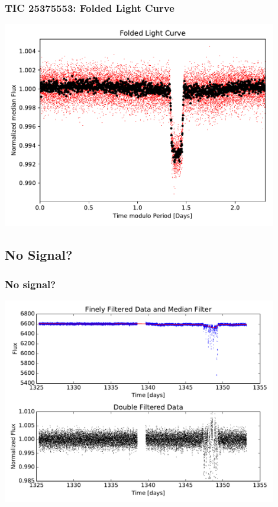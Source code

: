 \documentclass[notes]{beamer}
\begin{document}
\begin{frame}
\frametitle{TIC 25375553: Folded Light Curve}
\centering
\includegraphics[width=0.9\textwidth]{../figures/2019-1-16_13:47:28_Folded_TIC25375553.pdf}
\end{frame}

\subsection{No Signal?}

\begin{frame}
\frametitle{No signal?}
\centering
\includegraphics[width=0.9\textwidth]{../figures/2019-1-15_16:2:14_normcurve_lightcurve_TIC89020549.pdf}
\end{frame}
\end{document}
